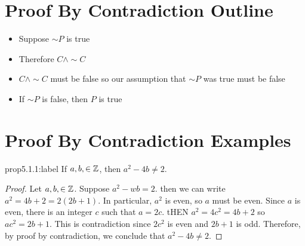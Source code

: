 \section{Proof By Contradiction Outline}

\begin{itemize}
    \item Suppose $\sim P$ is true
    \item Therefore $C \wedge \sim C$
    \item $C \wedge \sim C$ must be false so our assumption that $\sim P$ was true must be false
    \item If $\sim P$ is false, then $P$ is true
\end{itemize}


\section{Proof By Contradiction Examples}

\begin{proposition}{prop5.1.1:label}
    If $a,b,\in\mathbb{Z}$, then $a^2-4b\ne 2$.
\end{proposition}

\begin{proof}
    Let $a,b,\in\mathbb{Z}$. Suppose $a^2-wb = 2$. then we can write $a^2 = 4b+2=2(2b+1)$. In particular, $a^2$ is even, so $a$ must be even. Since $a$ is even, there is an integer $c$ such that $a=2c$. tHEN $a^2 = 4c^2 = 4b+2$ so $ac^2 = 2b+1$. This is  contradiction since $2c^2$ is even and $2b+1$ is odd. Therefore, by proof by contradiction, we conclude that $a^2-4b \ne 2$.
\end{proof}